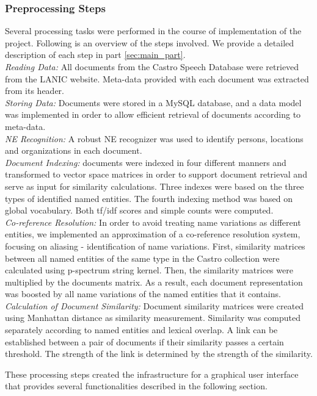 \subsubsection{Preprocessing Steps}
Several processing tasks were performed in the course of implementation of the project. Following is an overview of the steps involved. We provide a  detailed description of each step in part  \ref{sec:main_part}.\\
\emph{Reading Data:} All documents from the Castro Speech Database were retrieved from the LANIC website. Meta-data provided with each document was extracted from its header. \\
\emph{Storing Data:} Documents were stored in a MySQL database, and a data model was implemented in order to allow efficient retrieval of documents according to meta-data. \\
\emph{NE Recognition:} A robust NE recognizer was used to identify persons, locations and organizations in each document.\\
\emph{Document Indexing:} documents were indexed in four different manners and transformed to vector space matrices in order to support document retrieval and serve as input for similarity calculations. Three indexes were based on the three types of identified named entities. The fourth indexing method was based on global vocabulary. Both tf/idf scores and simple counts were computed.\\
\emph{Co-reference Resolution:} In order to avoid treating name variations as different entities, 
we implemented an approximation of a co-reference resolution system, focusing on aliasing - identification of name variations.
First, similarity matrices between all named entities of the same type in the Castro collection were calculated using p-spectrum string kernel.
Then, the similarity matrices were multiplied by the documents matrix. As a result, each document representation was boosted by all name 
variations of the named entities that it contains.\\
\emph{Calculation of Document Similarity:} Document similarity matrices were created using Manhattan distance as similarity measurement. 
Similarity was computed separately according to named entities and  lexical overlap. 
A link can be established between a pair of documents if their similarity passes a certain threshold. 
The strength of the link is determined by the strength of the similarity.

These processing steps created the infrastructure for a graphical user interface that provides several
functionalities described in the following section.

